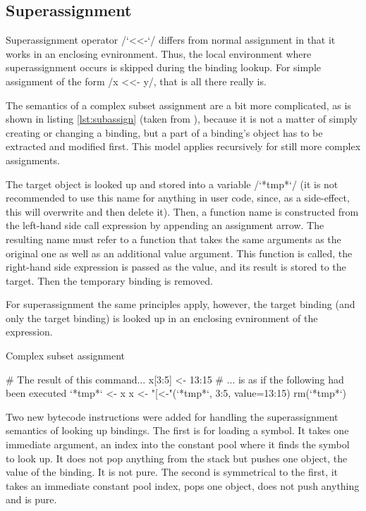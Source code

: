 


\subsection{Superassignment}

Superassignment operator \rinline/`<<-`/ differs from normal assignment in that it works in an enclosing evnironment. Thus, the local environment where superassignment occurs is skipped during the binding lookup. For simple assignment of the form \rinline/x <<- y/, that is all there really is.

The semantics of a complex subset assignment are a bit more complicated, as is shown in listing \ref{lst:subassign} (taken from \autocite{subset}), because it is not a matter of simply creating or changing a binding, but a part of a binding's object has to be extracted and modified first. This model applies recursively for still more complex assignments.

The target object is looked up and stored into a variable \rinline/`*tmp*`/ (it is not recommended to use this name for anything in user code, since, as a side-effect, this will overwrite and then delete it). Then, a function name is constructed from the left-hand side call expression by appending an assignment arrow. The resulting name must refer to a function that takes the same arguments as the original one as well as an additional value argument. This function is called, the right-hand side expression is passed as the value, and its result is stored to the target. Then the temporary binding is removed.

For superassignment the same principles apply, however, the target binding (and only the target binding) is looked up in an enclosing evnironment of the expression.

\begin{listing}[htbp]
  \caption{\label{lst:subassign}Complex subset assignment}
  \begin{rcode}
# The result of this command...
x[3:5] <- 13:15
# ... is as if the following had been executed
`*tmp*` <- x
x <- "[<-"(`*tmp*`, 3:5, value=13:15)
rm(`*tmp*`)
  \end{rcode}
\end{listing}

Two new bytecode instructions were added for handling the superassignment semantics of looking up bindings. The first is for loading a symbol. It takes one immediate argument, an index into the constant pool where it finds the symbol to look up. It does not pop anything from the stack but pushes one object, the value of the binding. It is not pure. The second is symmetrical to the first, it takes an immediate constant pool index, pops one object, does not push anything and is pure.

